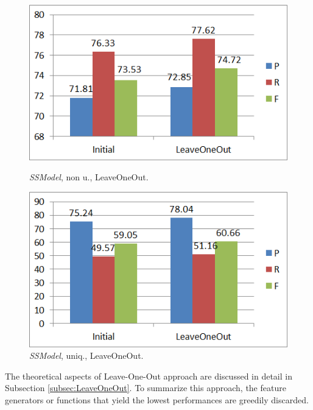 \begin{figure}
\centering
\begin{minipage}{.5\textwidth}
  \centering
  \includegraphics[width=.95\textwidth]{figures/LeaveOneOutNUniq.png}
  \caption{\textit{SSModel}, non u., LeaveOneOut.}
  \label{fig:LeaveOO_NU}
\end{minipage}%
\begin{minipage}{.5\textwidth}
  \centering
  \includegraphics[width=.95\textwidth]{figures/LeaveOneOutUniq.png}
  \caption{\textit{SSModel}, uniq., LeaveOneOut.}
  \label{fig:LeaveOO_U}
\end{minipage}
\end{figure}

The theoretical aspects of Leave-One-Out approach are discussed in detail in Subsection \ref{subsec:LeaveOneOut}. To summarize this approach, the feature generators or functions that yield the lowest performances are greedily discarded.


